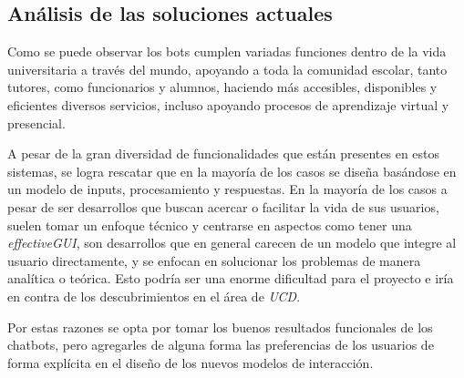     \subsection{Análisis de las soluciones actuales}
    \par Como se puede observar los bots cumplen variadas funciones dentro de la vida universitaria a través del mundo, apoyando a toda la comunidad escolar, tanto tutores, como funcionarios y alumnos, haciendo más accesibles, disponibles y eficientes diversos servicios, incluso apoyando procesos de aprendizaje virtual y presencial.
    \par A pesar de la gran diversidad de funcionalidades que están presentes en estos sistemas, se logra rescatar que en la mayoría de los casos se diseña basándose en un modelo de inputs, procesamiento y respuestas. En la mayoría de los casos a pesar de ser desarrollos que buscan acercar o facilitar la vida de sus usuarios, suelen tomar un enfoque técnico y centrarse en aspectos como tener una \textit{\acrshort{effectiveGUI}}, son desarrollos que en general carecen de un modelo que integre al usuario directamente, y se enfocan en solucionar los problemas de manera analítica o teórica. Esto podría ser una enorme dificultad para el proyecto e iría en contra de los descubrimientos en el área de \textit{\acrlong{UCD}}.
    \par Por estas razones se opta por tomar los buenos resultados funcionales de los chatbots, pero agregarles de alguna forma las preferencias de los usuarios de forma explícita en el diseño de los nuevos modelos de interacción.

